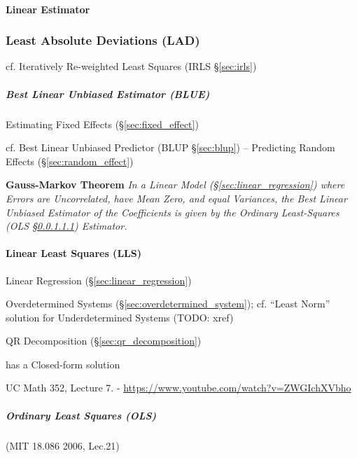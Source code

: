\paragraph{Linear Estimator}\label{sec:linear_estimator}\hfill




\subsubsection{Least Absolute Deviations (LAD)}\label{sec:lad}

cf. Iteratively Re-weighted Least Squares (IRLS \S\ref{sec:irls})



\subparagraph{Best Linear Unbiased Estimator (BLUE)}\label{sec:blue}\hfill

Estimating Fixed Effects (\S\ref{sec:fixed_effect})

cf. Best Linear Unbiased Predictor (BLUP \S\ref{sec:blup})
-- Predicting Random Effects (\S\ref{sec:random_effect})

\textbf{Gauss-Markov Theorem} \emph{
  In a Linear Model (\S\ref{sec:linear_regression}) where Errors are
  Uncorrelated, have Mean Zero, and equal Variances, the Best Linear Unbiased
  Estimator of the Coefficients is given by the Ordinary Least-Squares (OLS
  \S\ref{sec:ols}) Estimator.
}



\paragraph{Linear Least Squares (LLS)}\label{sec:lls}\hfill

Linear Regression (\S\ref{sec:linear_regression})

Overdetermined Systems (\S\ref{sec:overdetermined_system}); cf. ``Least Norm''
solution for Underdetermined Systems (TODO: xref)

QR Decomposition (\S\ref{sec:qr_decomposition})

has a Closed-form solution

UC Math 352, Lecture 7. - \url{https://www.youtube.com/watch?v=ZWGIchXVbho}



\subparagraph{Ordinary Least Squares (OLS)}\label{sec:ols}\hfill

(MIT 18.086 2006, Lec.21)

